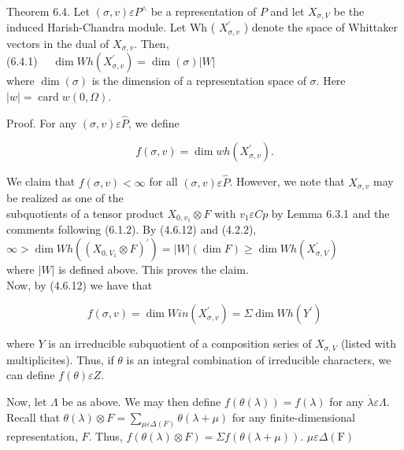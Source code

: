 \documentclass[10pt]{article}
\begin{document}
Theorem 6.4. Let $(\sigma, v) \varepsilon P^{\wedge}$ be a representation of $P$ and let $X_{\sigma, V}$ be the induced Harish-Chandra module. Let Wh ( $X_{\sigma, v}^{\prime}$ ) denote the space of Whittaker vectors in the dual of $X_{\sigma, v}$. Then,\\
(6.4.1) $\quad \operatorname{dim} W h\left(X_{\sigma, v}^{\prime}\right)=\operatorname{dim}(\sigma)|W|$\\
where $\operatorname{dim}(\sigma)$ is the dimension of a representation space of $\sigma$. Here $|w|=\operatorname{card} w(0, \Omega)$.

Proof. For any $(\sigma, v) \varepsilon \hat{P}$, we define


\begin{equation*}
f(\sigma, v)=\operatorname{dim} w h\left(X_{\sigma, v}^{\prime}\right) . \tag{6.4.2}
\end{equation*}


We claim that $f(\sigma, v)<\infty$ for all $(\sigma, v) \varepsilon \hat{P}$. However, we note that $X_{\sigma, v}$ may be realized as one of the\\
subquotients of a tensor product $X_{0, v_{1}} \otimes F$ with $v_{1} \varepsilon C p$ by Lemma 6.3.1 and the comments following (6.1.2). By (4.6.12) and (4.2.2),\\
$\infty>\operatorname{dim} W h\left(\left(X_{0, V_{1}} \otimes F\right)^{\prime}\right)=|W|(\operatorname{dim} F) \geq \operatorname{dim} W h\left(X_{\sigma, V}^{\prime}\right)$\\
where $|W|$ is defined above. This proves the claim.\\
Now, by (4.6.12) we have that


\begin{equation*}
f(\sigma, v)=\operatorname{dim} W i n\left(X_{\sigma, v}^{\prime}\right)=\Sigma \operatorname{dim} W h\left(Y^{\prime}\right) \tag{6.4.3}
\end{equation*}


where $Y$ is an irreducible subquotient of a composition series of $X_{\sigma, V}$ (listed with multiplicites). Thus, if $\theta$ is an integral combination of irreducible characters, we can define $f(\theta) \varepsilon Z$.

Now, let $\Lambda$ be as above. We may then define $f(\theta(\lambda))=f(\lambda)$ for any $\dot{\lambda} \varepsilon \Lambda$. Recall that $\theta(\lambda) \otimes F=\sum_{\mu \varepsilon \Delta(F)} \theta(\lambda+\mu)$ for any finite-dimensional representation, $F$. Thus, $f(\theta(\lambda) \otimes F)=\Sigma f(\theta(\lambda+\mu))$. $\mu \varepsilon \Delta(\mathrm{F})$
\end{document}
